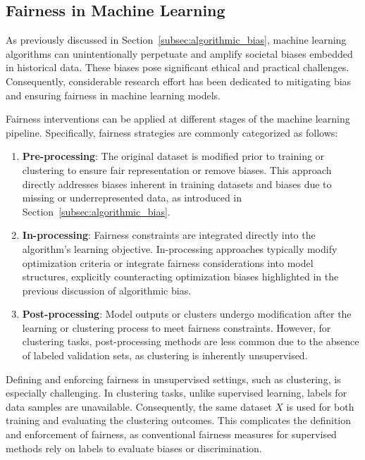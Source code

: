 \subsection{Fairness in Machine Learning}
As previously discussed in Section~\ref{subsec:algorithmic_bias},
machine learning algorithms can unintentionally perpetuate and
amplify societal biases embedded in historical data. These biases
pose significant ethical and practical challenges. Consequently,
considerable research effort has been dedicated to mitigating bias
and ensuring fairness in machine learning models.

Fairness interventions can be applied at different stages of the
machine learning pipeline. Specifically, fairness strategies are
commonly categorized as follows:

\begin{enumerate}
  \item \textbf{Pre-processing}: The original dataset is modified
    prior to training or clustering to ensure fair representation or
    remove biases. This approach directly addresses biases inherent
    in training datasets and biases due to missing or
    underrepresented data, as introduced in
    Section~\ref{subsec:algorithmic_bias}.

  \item \textbf{In-processing}: Fairness constraints are integrated
    directly into the algorithm's learning objective. In-processing
    approaches typically modify optimization criteria or integrate
    fairness considerations into model structures, explicitly
    counteracting optimization biases highlighted in the previous
    discussion of algorithmic bias.

  \item \textbf{Post-processing}: Model outputs or clusters undergo
    modification after the learning or clustering process to meet
    fairness constraints. However, for clustering tasks,
    post-processing methods are less common due to the absence of
    labeled validation sets, as clustering is inherently unsupervised.
\end{enumerate}

Defining and enforcing fairness in unsupervised settings, such as
clustering, is especially challenging. In clustering tasks, unlike
supervised learning, labels for data
samples are unavailable. Consequently, the same dataset \(X\) is used
for both training and evaluating the clustering outcomes. This
complicates the definition and enforcement of fairness, as
conventional fairness measures for supervised methods rely on labels
to evaluate biases or discrimination.


